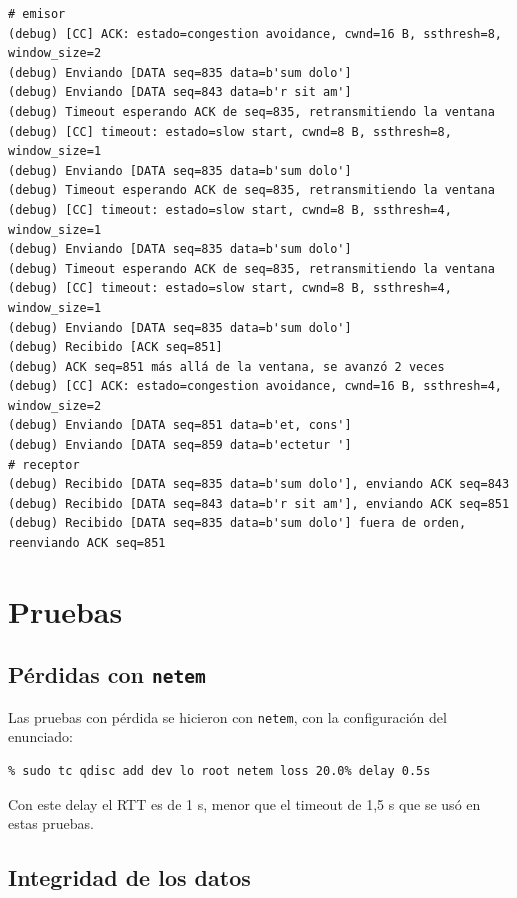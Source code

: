 \documentclass[11pt,letterpaper]{article}
\begin{document}
\begin{lstlisting}
# emisor
(debug) [CC] ACK: estado=congestion avoidance, cwnd=16 B, ssthresh=8, window_size=2
(debug) Enviando [DATA seq=835 data=b'sum dolo']
(debug) Enviando [DATA seq=843 data=b'r sit am']
(debug) Timeout esperando ACK de seq=835, retransmitiendo la ventana
(debug) [CC] timeout: estado=slow start, cwnd=8 B, ssthresh=8, window_size=1
(debug) Enviando [DATA seq=835 data=b'sum dolo']
(debug) Timeout esperando ACK de seq=835, retransmitiendo la ventana
(debug) [CC] timeout: estado=slow start, cwnd=8 B, ssthresh=4, window_size=1
(debug) Enviando [DATA seq=835 data=b'sum dolo']
(debug) Timeout esperando ACK de seq=835, retransmitiendo la ventana
(debug) [CC] timeout: estado=slow start, cwnd=8 B, ssthresh=4, window_size=1
(debug) Enviando [DATA seq=835 data=b'sum dolo']
(debug) Recibido [ACK seq=851]
(debug) ACK seq=851 más allá de la ventana, se avanzó 2 veces
(debug) [CC] ACK: estado=congestion avoidance, cwnd=16 B, ssthresh=4, window_size=2
(debug) Enviando [DATA seq=851 data=b'et, cons']
(debug) Enviando [DATA seq=859 data=b'ectetur ']
# receptor
(debug) Recibido [DATA seq=835 data=b'sum dolo'], enviando ACK seq=843
(debug) Recibido [DATA seq=843 data=b'r sit am'], enviando ACK seq=851
(debug) Recibido [DATA seq=835 data=b'sum dolo'] fuera de orden, reenviando ACK seq=851
\end{lstlisting}

\section{Pruebas}
\label{sec:pruebas}

\subsection{Pérdidas con \texttt{netem}}
\label{sec:netem}

Las pruebas con pérdida se hicieron con \texttt{netem}, con la configuración del
enunciado:

\begin{lstlisting}
% sudo tc qdisc add dev lo root netem loss 20.0% delay 0.5s
\end{lstlisting}

Con este delay el RTT es de 1 s, menor que el timeout de 1,5 s que se usó en estas
pruebas.

\subsection{Integridad de los datos}
\end{document}
